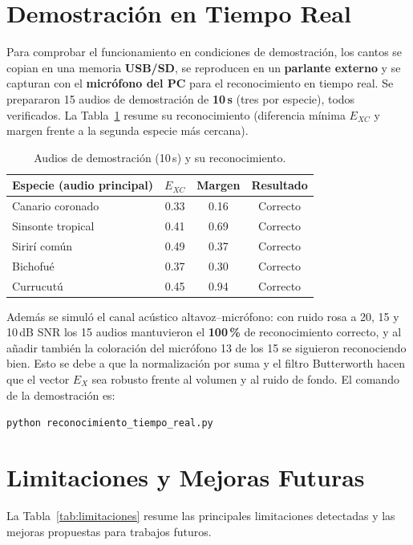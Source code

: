 \documentclass[conference]{IEEEtran}
\begin{document}
\section{Demostración en Tiempo Real}\label{sec:demo}
Para comprobar el funcionamiento en condiciones de demostración, los cantos se
copian en una memoria \textbf{USB/SD}, se reproducen en un \textbf{parlante
externo} y se capturan con el \textbf{micrófono del PC} para el reconocimiento en
tiempo real. Se prepararon 15 audios de demostración de \textbf{10\,s} (tres por
especie), todos verificados. La Tabla~\ref{tab:demo} resume su reconocimiento
(diferencia mínima $E_{XC}$ y margen frente a la segunda especie más cercana).

\begin{table}[!t]
\caption{Audios de demostración (10\,s) y su reconocimiento.}
\label{tab:demo}
\centering
\renewcommand{\arraystretch}{1.2}
\begin{tabularx}{\columnwidth}{@{}X c c c@{}}
\toprule
\textbf{Especie (audio principal)} & \textbf{$E_{XC}$} & \textbf{Margen} & \textbf{Resultado} \\
\midrule
Canario coronado  & 0.33 & 0.16 & Correcto \\
Sinsonte tropical & 0.41 & 0.69 & Correcto \\
Sirirí común      & 0.49 & 0.37 & Correcto \\
Bichofué          & 0.37 & 0.30 & Correcto \\
Currucutú         & 0.45 & 0.94 & Correcto \\
\bottomrule
\end{tabularx}
\end{table}

Además se simuló el canal acústico altavoz--micrófono: con ruido rosa a 20, 15 y
10\,dB SNR los 15 audios mantuvieron el \textbf{100\,\%} de reconocimiento
correcto, y al añadir también la coloración del micrófono 13 de los 15 se
siguieron reconociendo bien. Esto se debe a que la normalización por suma y el
filtro Butterworth hacen que el vector $E_X$ sea robusto frente al volumen y al
ruido de fondo. El comando de la demostración es:
\begin{center}
\texttt{python reconocimiento\_tiempo\_real.py}
\end{center}

\section{Limitaciones y Mejoras Futuras}\label{sec:limitaciones}
La Tabla~\ref{tab:limitaciones} resume las principales limitaciones detectadas y
las mejoras propuestas para trabajos futuros.
\end{document}
